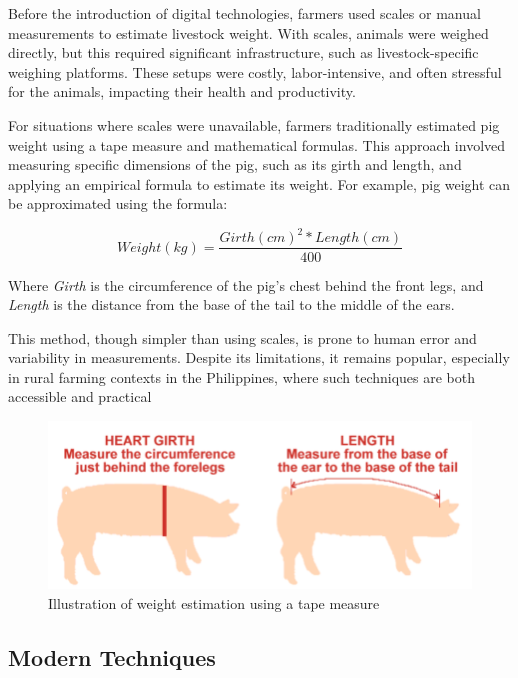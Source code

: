 {Before the introduction of digital technologies, farmers used scales or manual measurements to estimate livestock weight. With scales, animals were weighed directly, but this required significant infrastructure, such as livestock-specific weighing platforms. These setups were costly, labor-intensive, and often stressful for the animals, impacting their health and productivity.

For situations where scales were unavailable, farmers traditionally estimated pig weight using a tape measure and mathematical formulas. This approach involved measuring specific dimensions of the pig, such as its girth and length, and applying an empirical formula to estimate its weight. For example, pig weight can be approximated using the formula:

\begin{equation}
	Weight(kg) = \frac{Girth (cm)^2 * Length (cm)}{400}
\end{equation}

Where \textit{Girth} is the circumference of the pig's chest behind the front legs, and \textit{Length} is the distance from the base of the tail to the middle of the ears.

This method, though simpler than using scales, is prone to human error and variability in measurements. Despite its limitations, it remains popular, especially in rural farming contexts in the Philippines, where such techniques are both accessible and practical

\begin{figure}[h]
	\centering
	\includegraphics[height=0.25\textheight]{figures/Pig Tape Measure}
	\caption{Illustration of weight estimation using a tape measure}
	\label{fig:Tape Measure}
\end{figure}

\subsection{Modern Techniques}

}
